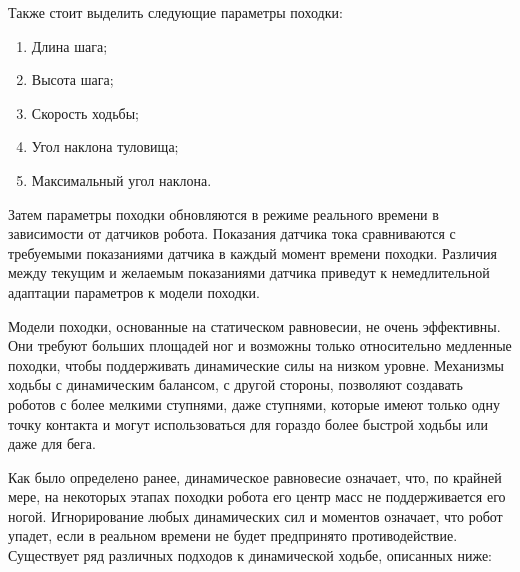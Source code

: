 Также стоит выделить следующие параметры походки:

\begin{enumerate}
	\item Длина шага;
	\item Высота шага;
	\item Скорость ходьбы;
	\item Угол наклона туловища;
	\item Максимальный угол наклона.
\end{enumerate}

Затем параметры походки обновляются в режиме реального времени в зависимости от датчиков робота. Показания датчика тока сравниваются с требуемыми показаниями датчика в каждый момент времени походки. Различия между текущим и желаемым показаниями датчика приведут к немедлительной адаптации параметров к модели походки.

Модели походки, основанные на статическом равновесии, не очень эффективны. Они требуют больших площадей ног и возможны только относительно медленные походки, чтобы поддерживать динамические силы на низком уровне. Механизмы ходьбы с динамическим балансом, с другой стороны, позволяют создавать роботов с более мелкими ступнями, даже ступнями, которые имеют только одну точку контакта и могут использоваться для гораздо более быстрой ходьбы или даже для бега.

Как было определено ранее, динамическое равновесие означает, что, по крайней мере, на некоторых этапах походки робота его центр масс не поддерживается его ногой. Игнорирование любых динамических сил и моментов означает, что робот упадет, если в реальном времени не будет предпринято противодействие. Существует ряд различных подходов к динамической ходьбе, описанных ниже:

